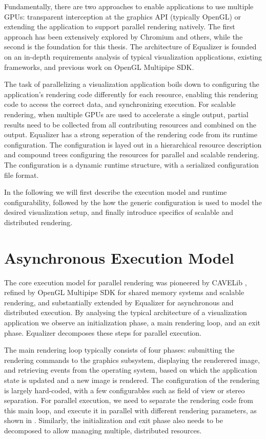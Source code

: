 Fundamentally, there are two approaches to enable applications to use multiple
GPUs: transparent interception at the graphics API (typically OpenGL) or
extending the application to support parallel rendering natively. The first
approach has been extensively explored by Chromium and others, while the second
is the foundation for this thesis. The architecture of Equalizer is founded on
an in-depth requirements analysis of typical visualization applications,
existing frameworks, and previous work on OpenGL Multipipe SDK.

The task of parallelizing a visualization application boils down to configuring
the application's rendering code differently for each resource, enabling this
rendering code to access the correct data, and synchronizing execution. For
scalable rendering, when multiple GPUs are used to accelerate a single output,
partial results need to be collected from all contributing resources and
combined on the output. Equalizer has a strong seperation of the rendering code
from its runtime configuration. The configuration is layed out in a hierarchical
resource description and compound trees configuring the resources for parallel
and scalable rendering. The configuration is a dynamic runtime structure, with a
serialized configuration file format.

In the following we will first describe the execution model and runtime
configurability, followed by the how the generic configuration is used to model
the desired visualization setup, and finally introduce specifics of scalable and
distributed rendering.

\section{Asynchronous Execution Model}

The core execution model for parallel rendering was pioneered by CAVELib
\cite{DACNCCGHPSNS:97}, refined by OpenGL Multipipe SDK for shared memory
systems and scalable rendering, and substantially extended by Equalizer for
asynchronous and distributed execution. By analysing the typical architecture of
a visualization application we observe an initialization phase, a main rendering
loop, and an exit phase. Equalizer decomposes these steps for parallel
execution.

The main rendering loop typically consists of four phases: submitting the
rendering commands to the graphics subsystem, displaying the renderered image,
and retrieving events from the operating system, based on which the application
state is updated and a new image is rendered. The configuration of the rendering
is largely hard-coded, with a few configurables such as field of view or stereo
separation. For parallel execution, we need to separate the rendering code from
this main loop, and execute it in parallel with different rendering parameters,
as shown in . Similarly, the initialization and exit phase
also needs to be decomposed to allow managing multiple, distributed resources.

